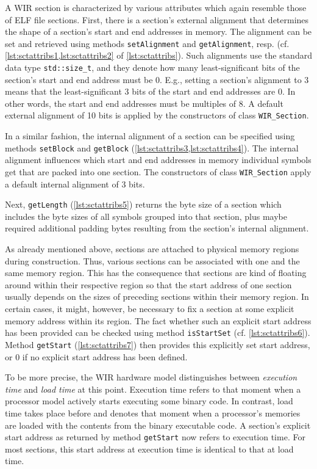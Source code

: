 A \gls{WIR} section is characterized by various attributes which again resemble those of \gls{ELF} file sections.
First, there is a section's external alignment that determines the shape of a section's start and end addresses in memory.
The alignment can be set and retrieved using methods \texttt{setAlignment} and \texttt{getAlignment}, resp. (cf. \cref{lst:sctattribs1,lst:sctattribs2} of \cref{lst:sctattribs}).
Such alignments use the standard data type \texttt{std::size\_t}, and they denote how many least-significant bits of the section's start and end address must be 0.
E.g., setting a section's alignment to 3 means that the least-significant 3 bits of the start and end addresses are 0.
In other words, the start and end addresses must be multiples of 8.
A default external alignment of 10 bits is applied by the constructors of class \texttt{WIR\_Section}.

In a similar fashion, the internal alignment of a section can be specified using methods \texttt{setBlock} and \texttt{getBlock} (\cref{lst:sctattribs3,lst:sctattribs4}).
The internal alignment influences which start and end addresses in memory individual symbols get that are packed into one section.
The constructors of class \texttt{WIR\_Section} apply a default internal alignment of 3 bits.

Next, \texttt{getLength} (\cref{lst:sctattribs5}) returns the byte size of a section which includes the byte sizes of all symbols grouped into that section, plus maybe required additional padding bytes resulting from the section's internal alignment.

As already mentioned above, sections are attached to physical memory regions during construction.
Thus, various sections can be associated with one and the same memory region.
This has the consequence that sections are kind of floating around within their respective region so that the start address of one section usually depends on the sizes of preceding sections within their memory region.
In certain cases, it might, however, be necessary to fix a section at some explicit memory address within its region.
The fact whether such an explicit start address has been provided can be checked using method \texttt{isStartSet} (cf. \cref{lst:sctattribs6}).
Method \texttt{getStart} (\cref{lst:sctattribs7}) then provides this explicitly set start address, or 0 if no explicit start address has been defined.

To be more precise, the \gls{WIR} hardware model distinguishes between \emph{execution time} and \emph{load time} at this point.
Execution time refers to that moment when a processor model actively starts executing some binary code.
In contrast, load time takes place before and denotes that moment when a processor's memories are loaded with the contents from the binary executable code.
A section's explicit start address as returned by method \texttt{getStart} now refers to execution time.
For most sections, this start address at execution time is identical to that at load time.


